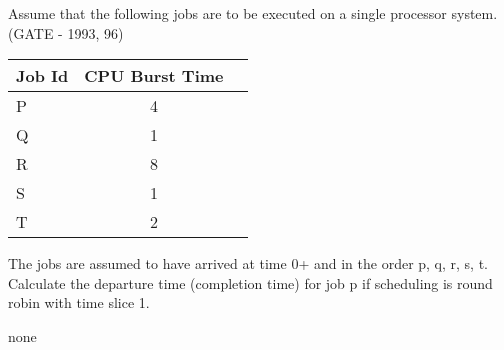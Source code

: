 

\begin{questyle}

  \question Assume that  the following jobs are to be executed on a single processor system. (GATE - 1993, 96)

    \begin{myTableStyle}
    \begin{center}
    \begin{tabular}{ |l|c|c| } \hline
        Job Id &   CPU Burst Time     \\ \hline
        P      &   4                \\ \hline
        Q      &   1                \\ \hline
        R      &   8                \\ \hline
        S      &   1                \\ \hline
        T      &   2                \\ \hline
    \end{tabular}
    \end{center}
  \end{myTableStyle}
  \vspace{0.08in}
  The jobs are assumed to have arrived at time 0+ and in the order p, q, r, s, t. Calculate the
  departure time (completion time) for job p if scheduling is round robin with time slice 1.

  \begin{oneparchoices}
    \choice none
  \end{oneparchoices}
  \end{questyle}



